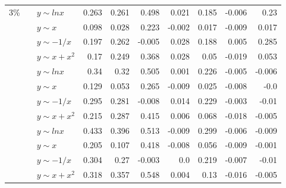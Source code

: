 \begin{table*}[!ht]
\begin{tabular}{| l | l | l | r | r | r | r | r | r | r | }
\multirow{16}{*}{3\%}

&\multirow{4}{*}{\metricone{}}
&$y\sim lnx$&\cellcolor[rgb]{.7,.7,.7}0.263&\cellcolor[rgb]{.7,.7,.7}0.261&\cellcolor[rgb]{.7,.7,.7}0.498&\cellcolor[rgb]{.9,.9,.9}0.021&\cellcolor[rgb]{.9,.9,.9}0.185&-0.006&\cellcolor[rgb]{.9,.9,.9}0.23  \\ \cline{3-10}
&&$y\sim x$&\cellcolor[rgb]{.9,.9,.9}0.098&\cellcolor[rgb]{.9,.9,.9}0.028&\cellcolor[rgb]{.9,.9,.9}0.223&-0.002&\cellcolor[rgb]{.9,.9,.9}0.017&-0.009&\cellcolor[rgb]{.9,.9,.9}0.017  \\ \cline{3-10}
&&$y\sim -1/x$&\cellcolor[rgb]{.9,.9,.9}0.197&\cellcolor[rgb]{.7,.7,.7}0.262&-0.005&\cellcolor[rgb]{.9,.9,.9}0.028&\cellcolor[rgb]{.9,.9,.9}0.188&\cellcolor[rgb]{.9,.9,.9}0.005&\cellcolor[rgb]{.7,.7,.7}0.285  \\ \cline{3-10}
&&$y\sim x+x^2$&\cellcolor[rgb]{.9,.9,.9}0.17&\cellcolor[rgb]{.9,.9,.9}0.249&\cellcolor[rgb]{.7,.7,.7}0.368&\cellcolor[rgb]{.9,.9,.9}0.028&\cellcolor[rgb]{.9,.9,.9}0.05&-0.019&\cellcolor[rgb]{.9,.9,.9}0.053  \\ \cline{2-10}

&\multirow{4}{*}{\metrictwor{}}
&$y\sim lnx$&\cellcolor[rgb]{.7,.7,.7}0.34&\cellcolor[rgb]{.7,.7,.7}0.32&\cellcolor[rgb]{.5,.5,.5}0.505&\cellcolor[rgb]{.9,.9,.9}0.001&\cellcolor[rgb]{.9,.9,.9}0.226&-0.005&-0.006  \\ \cline{3-10}
&&$y\sim x$&\cellcolor[rgb]{.9,.9,.9}0.129&\cellcolor[rgb]{.9,.9,.9}0.053&\cellcolor[rgb]{.7,.7,.7}0.265&-0.009&\cellcolor[rgb]{.9,.9,.9}0.025&-0.008&-0.0  \\ \cline{3-10}
&&$y\sim -1/x$&\cellcolor[rgb]{.7,.7,.7}0.295&\cellcolor[rgb]{.7,.7,.7}0.281&-0.008&\cellcolor[rgb]{.9,.9,.9}0.014&\cellcolor[rgb]{.9,.9,.9}0.229&-0.003&-0.01  \\ \cline{3-10}
&&$y\sim x+x^2$&\cellcolor[rgb]{.9,.9,.9}0.215&\cellcolor[rgb]{.7,.7,.7}0.287&\cellcolor[rgb]{.7,.7,.7}0.415&\cellcolor[rgb]{.9,.9,.9}0.006&\cellcolor[rgb]{.9,.9,.9}0.068&-0.018&-0.005  \\ \cline{2-10}

&\multirow{4}{*}{\metrictwok{}}
&$y\sim lnx$&\cellcolor[rgb]{.7,.7,.7}0.433&\cellcolor[rgb]{.7,.7,.7}0.396&\cellcolor[rgb]{.5,.5,.5}0.513&-0.009&\cellcolor[rgb]{.7,.7,.7}0.299&-0.006&-0.009  \\ \cline{3-10}
&&$y\sim x$&\cellcolor[rgb]{.9,.9,.9}0.205&\cellcolor[rgb]{.9,.9,.9}0.107&\cellcolor[rgb]{.7,.7,.7}0.418&-0.008&\cellcolor[rgb]{.9,.9,.9}0.056&-0.009&-0.001  \\ \cline{3-10}
&&$y\sim -1/x$&\cellcolor[rgb]{.7,.7,.7}0.304&\cellcolor[rgb]{.7,.7,.7}0.27&-0.003&0.0&\cellcolor[rgb]{.9,.9,.9}0.219&-0.007&-0.01  \\ \cline{3-10}
&&$y\sim x+x^2$&\cellcolor[rgb]{.7,.7,.7}0.318&\cellcolor[rgb]{.7,.7,.7}0.357&\cellcolor[rgb]{.5,.5,.5}0.548&\cellcolor[rgb]{.9,.9,.9}0.004&\cellcolor[rgb]{.9,.9,.9}0.13&-0.016&-0.005  \\ \cline{2-10}


\end{tabular}
\end{table*}
